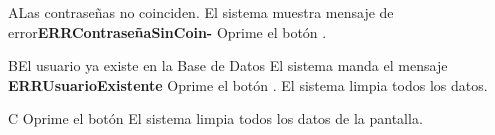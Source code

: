 		\begin{UCtrayectoriaA}{A}{Las contraseñas no coinciden.}
			\UCpaso El sistema muestra mensaje de error{\bf ERRContraseñaSinCoin-}
			\UCpaso[\UCactor]Oprime el botón .
		\end{UCtrayectoriaA}
		
		
	\begin{UCtrayectoriaA}{B}{El usuario ya existe en la Base de Datos}
			\UCpaso El sistema manda el mensaje {\bf ERRUsuarioExistente}
			\UCpaso[\UCactor]Oprime el botón .
			\UCpaso El sistema limpia todos los datos. 
		\end{UCtrayectoriaA}
		
		\begin{UCtrayectoriaA}{C}{}
			\UCpaso[\UCactor]Oprime el botón 
			\UCpaso El sistema limpia todos los datos de la pantalla. 
		\end{UCtrayectoriaA}
		
